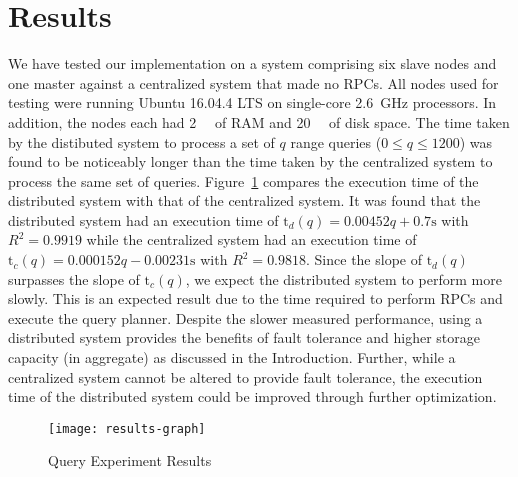 \section{Results}
We have tested our implementation on a system comprising six slave nodes and one master
against a centralized system that made no RPCs. All nodes used for testing were
running Ubuntu 16.04.4 LTS on single-core \SI{2.6}{\giga\hertz} processors. In
addition, the nodes each had \SI{2}{\gibi\byte} of RAM and \SI{20}{\gibi\byte}
of disk space. The time taken by the distibuted system to process a set of
\(q\) range queries (\(0 \leq q \leq 1200\)) was found to be noticeably longer
than the time taken by the centralized system to process the same set of
queries. Figure~\ref{fig:graph-of-results} compares the execution time of the
distributed system with that of the centralized system. It was found that the
distributed system had an execution time of
\(\mathrm{t}_d(q) = 0.00452 q + 0.7 \mathrm{s}\)
with \(R^2 = 0.9919\) while the centralized system had an execution time of
\(\mathrm{t}_c(q) = 0.000152 q - 0.00231 \mathrm{s}\)
with \(R^2 = 0.9818\). Since the slope of \(\mathrm{t}_d(q)\) surpasses the
slope of \(\mathrm{t}_c(q)\), we expect the distributed system to perform more
slowly. This is an expected result due to the time required to perform RPCs and
execute the query planner. Despite the slower measured performance, using a
distributed system provides the benefits of fault tolerance and higher storage
capacity (in aggregate) as discussed in the Introduction. Further, while a
centralized system cannot be altered to provide fault tolerance, the execution
time of the distributed system could be improved through further optimization.
%
\begin{figure}
    \centering
    \texttt{[image: results-graph]}
    \caption{Query Experiment Results}\label{fig:graph-of-results}
\end{figure}
